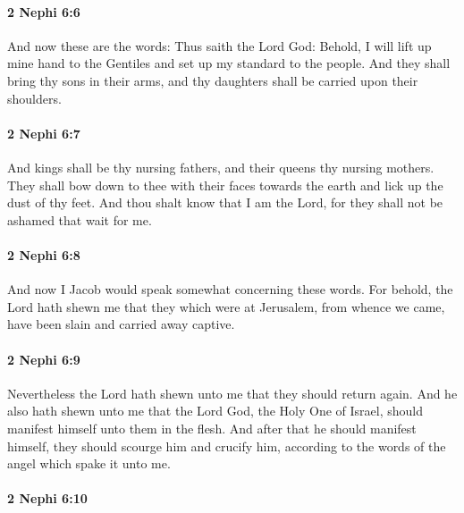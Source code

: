 		\paragraph{2 Nephi 6:6} %
			\label{2NEPHI-6-6}

			And now these are the words:
			Thus saith the Lord God:
			Behold, I will lift up mine hand to the Gentiles
			and set up my standard to the people.
			And they shall bring thy sons in their arms,
			and thy daughters shall be carried upon their shoulders.

		\paragraph{2 Nephi 6:7} %
			\label{2NEPHI-6-7}

			And kings shall be thy nursing fathers,
			and their queens thy nursing mothers.
			They shall bow down to thee with their faces towards the earth
			and lick up the dust of thy feet.
			And thou shalt know that I am the Lord,
			for they shall not be ashamed that wait for me.

		\paragraph{2 Nephi 6:8} %
			\label{2NEPHI-6-8}

			And now I Jacob would speak somewhat concerning these words.
			For behold, the Lord hath shewn me
			that they which were at Jerusalem, from whence we came,
			have been slain and carried away captive.

		\paragraph{2 Nephi 6:9} %
			\label{2NEPHI-6-9}

			Nevertheless the Lord hath shewn unto me
			that they should return again.
			And he also hath shewn unto me
			that the Lord God, the Holy One of Israel,
			should manifest himself unto them in the flesh.
			And after that he should manifest himself,
			they should scourge him and crucify him,
			according to the words of the angel which spake it unto me.

		\paragraph{2 Nephi 6:10} %
			\label{2NEPHI-6-10}

